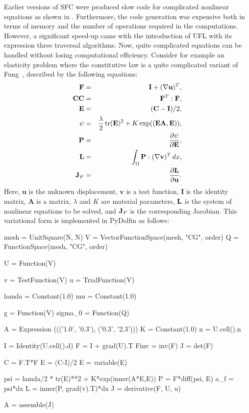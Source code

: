Earlier versions of SFC were produced slow code for complicated nonlinear
equations as shown in \citep{AlnaesMardal2009b}. Furthermore, 
the code generation was expensive both in terms of memory and the number
of operations required in the computations. 
However, a significant speed-up came with the introduction of UFL 
with its expression three traversal algorithms.  
Now, quite complicated 
equations can be handled without losing computational efficiency. Consider for example an elasticity problem 
where the constitutive law is a quite complicated variant of
Fung~\citep{Fung1993}, described by 
the following equations: 
\begin{eqnarray}
\mathbf{F} &=& \mathbf{I} + (\nabla \mathbf{u})^T, \\  
\mathbf{CC} &=& \mathbf{F}^T: \mathbf{F}, \\
\mathbf{E} &=& (\mathbf{C}-\mathbf{I})/2, \\ 
\psi &=& \frac{\lambda}{2} \, \mbox{tr}(\mathbf{E})^2 + K\exp((\mathbf{E}\mathbf{A},\mathbf{E})), \\  
\mathbf{P} &=& \frac{\partial \psi}{\partial \mathbf{E}}, \\
\mathbf{L} &=& \int_\Omega \mathbf{P}: (\nabla \mathbf{v})^T \, dx, \\  
\mathbf{J}_F &=& \frac{\partial \mathbf{L}}{\partial \mathbf{u}} . 
\end{eqnarray}
Here, $\mathbf{u}$ is the unknown displacement, $\mathbf{v}$ is a test function, $\mathbf{I}$ is the identity matrix, $\mathbf{A}$ 
is a matrix, $\lambda$ and $K$  are  material parameters, $\mathbf{L}$ is the system of nonlinear equations to be solved, and 
$\mathbf{J}_F$ is the corresponding Jacobian. 
This variational form is implemented in PyDolfin as follows: 
\begin{python}
  mesh = UnitSquare(N, N)
  V = VectorFunctionSpace(mesh, "CG", order)
  Q = FunctionSpace(mesh, "CG", order)
  
  U = Function(V)
  
  v = TestFunction(V)
  u = TrialFunction(V)
  
  lamda = Constant(1.0)
  mu = Constant(1.0)
  
  g       = Function(V)
  sigma_0 = Function(Q)
  
  A = Expression ((('1.0', '0.3'), ('0.3', '2.3')))
  K = Constant(1.0)
  n = U.cell().n
  
  I = Identity(U.cell().d)
  F = I + grad(U).T
  Finv = inv(F)
  J = det(F)
  
  C = F.T*F
  E = (C-I)/2
  E = variable(E)
  
  psi = lamda/2 * tr(E)**2  +  K*exp(inner(A*E,E))
  P = F*diff(psi, E)
  a_f = psi*dx
  L = inner(P, grad(v).T)*dx 
  J = derivative(F, U, u)
  
  A = assemble(J)
\end{python}

